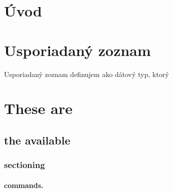 \documentclass[
  digital,     %
  oneside,     %
  nosansbold,  %
  colorbold, %
  lof,         %
  lot,         %
]{fithesis4}
\begin{document}

\chapter*{Úvod}

\chapter{Usporiadaný zoznam}

Usporiadaný zoznam definujem ako dátový typ, ktorý 


\chapter{These are}
\section{the available}
\subsection{sectioning}
\subsubsection{commands.}
\end{document}

